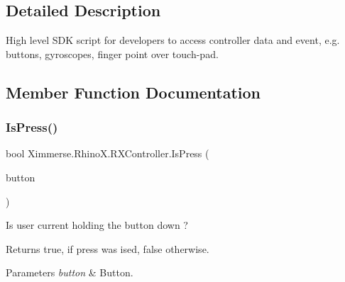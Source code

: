 \subsection{Detailed Description}
High level S\+DK script for developers to access controller data and event, e.\+g. buttons, gyroscopes, finger point over touch-\/pad. 



\subsection{Member Function Documentation}
\mbox{\label{class_ximmerse_1_1_rhino_x_1_1_r_x_controller_aa9d23fdcda8d7e24e342c26e5b8d6b27}} 
\subsubsection{\texorpdfstring{Is\+Press()}{IsPress()}}
{\footnotesize\ttfamily bool Ximmerse.\+Rhino\+X.\+R\+X\+Controller.\+Is\+Press (\begin{DoxyParamCaption}\item[{\mbox{\hyperlink{namespace_ximmerse_1_1_rhino_x_a99f73f11bba9d4b424daba6c5a5abc0b}{Controller\+Button\+Code}}}]{button }\end{DoxyParamCaption})\hspace{0.3cm}{\ttfamily [inline]}}



Is user current holding the button down ? 

\begin{DoxyReturn}{Returns}
{\ttfamily true}, if press was ised, {\ttfamily false} otherwise.
\end{DoxyReturn}

\begin{DoxyParams}{Parameters}
{\em button} & Button.\\
\hline
\end{DoxyParams}
\mbox{\label{class_ximmerse_1_1_rhino_x_1_1_r_x_controller_a89fb2bd2521d43205645fb6b205ddbcf}} 
